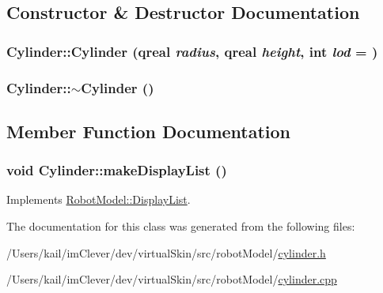 \subsection{Constructor \& Destructor Documentation}
\hypertarget{class_robot_model_1_1_cylinder_aa738cca8df1e6a449662f33a814e67f8}{
\subsubsection[{Cylinder}]{\setlength{\rightskip}{0pt plus 5cm}Cylinder::Cylinder (qreal {\em radius}, \/  qreal {\em height}, \/  int {\em lod} = {})}}
\label{class_robot_model_1_1_cylinder_aa738cca8df1e6a449662f33a814e67f8}
\hypertarget{class_robot_model_1_1_cylinder_a05ab556f0ae3cd6e99d9d1f3caca80b3}{
\subsubsection[{$\sim$Cylinder}]{\setlength{\rightskip}{0pt plus 5cm}Cylinder::$\sim$Cylinder ()}}
\label{class_robot_model_1_1_cylinder_a05ab556f0ae3cd6e99d9d1f3caca80b3}


\subsection{Member Function Documentation}
\hypertarget{class_robot_model_1_1_cylinder_a9f0361117d5f20344f543c9e20df1113}{
\subsubsection[{makeDisplayList}]{\setlength{\rightskip}{0pt plus 5cm}void Cylinder::makeDisplayList ()}}
\label{class_robot_model_1_1_cylinder_a9f0361117d5f20344f543c9e20df1113}


Implements \hyperlink{class_robot_model_1_1_display_list_a842de97924298c7363e50aebd69e5a50}{RobotModel::DisplayList}.

The documentation for this class was generated from the following files:\begin{DoxyCompactItemize}
\item 
/Users/kail/imClever/dev/virtualSkin/src/robotModel/\hyperlink{cylinder_8h}{cylinder.h}\item 
/Users/kail/imClever/dev/virtualSkin/src/robotModel/\hyperlink{cylinder_8cpp}{cylinder.cpp}\end{DoxyCompactItemize}
